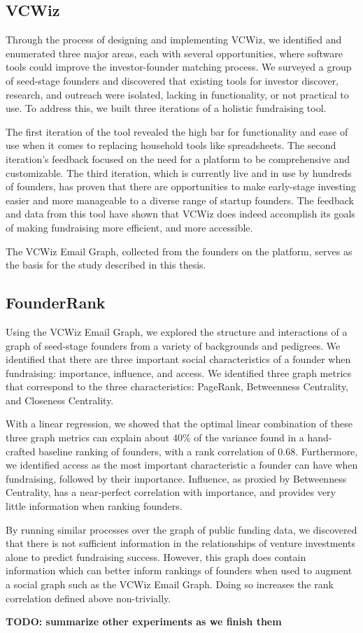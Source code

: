 \subsection{VCWiz}

Through the process of designing and implementing VCWiz, we identified and enumerated three major areas, each with several opportunities, where software tools could improve the investor-founder matching process. We surveyed a group of seed-stage founders and discovered that existing tools for investor discover, research, and outreach were isolated, lacking in functionality, or not practical to use. To address this, we built three iterations of a holistic fundraising tool.

The first iteration of the tool revealed the high bar for functionality and ease of use when it comes to replacing household tools like spreadsheets. The second iteration's feedback focused on the need for a platform to be comprehensive and customizable. The third iteration, which is currently live and in use by hundreds of founders, has proven that there are opportunities to make early-stage investing easier and more manageable to a diverse range of startup founders. The feedback and data from this tool have shown that VCWiz does indeed accomplish its goals of making fundraising more efficient, and more accessible.

The VCWiz Email Graph, collected from the founders on the platform, serves as the basis for the study described in this thesis.

\subsection{FounderRank}

Using the VCWiz Email Graph, we explored the structure and interactions of a graph of seed-stage founders from a variety of backgrounds and pedigrees. We identified that there are three important social characteristics of a founder when fundraising: importance, influence, and access. We identified three graph metrics that correspond to the three characteristics: PageRank, Betweenness Centrality, and Closeness Centrality.

With a linear regression, we showed that the optimal linear combination of these three graph metrics can explain about 40\% of the variance found in a hand-crafted baseline ranking of founders, with a rank correlation of $0.68$. Furthermore, we identified access as the most important characteristic a founder can have when fundraising, followed by their importance. Influence, as proxied by Betweenness Centrality, has a near-perfect correlation with importance, and provides very little information when ranking founders.

By running similar processes over the graph of public funding data, we discovered that there is not sufficient information in the relationships of venture investments alone to predict fundraising success. However, this graph does contain information which can better inform rankings of founders when used to augment a social graph such as the VCWiz Email Graph. Doing so increases the rank correlation defined above non-trivially.

\textbf{TODO: summarize other experiments as we finish them}
